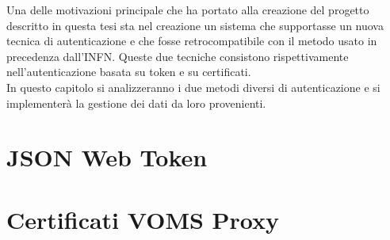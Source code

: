 Una delle motivazioni principale che ha portato alla creazione del progetto descritto in questa tesi 
sta nel creazione un sistema che supportasse 
un nuova tecnica di autenticazione e che fosse retrocompatibile con il metodo usato in precedenza dall'INFN.  
Queste due tecniche consistono rispettivamente nell'autenticazione basata su token e su certificati.    
\\ In questo capitolo si analizzeranno i due metodi diversi di autenticazione e si implementerà la gestione 
dei dati da loro provenienti.

\section{JSON Web Token}


\section{Certificati VOMS Proxy}